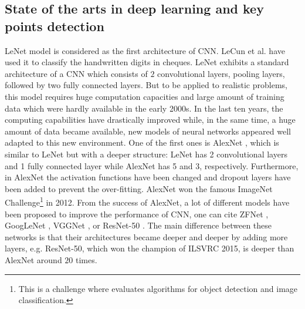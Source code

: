 \documentclass[review]{elsarticle}
\begin{document}
\subsection{State of the arts in deep learning and key points detection}
LeNet \cite{lecun1998gradient} model is considered as the first
architecture of CNN. LeCun et al. \cite{lecun1998gradient} have used
it to classify the handwritten digits in cheques. LeNet exhibits a
standard architecture of a CNN which consists of $2$ convolutional
layers, pooling layers, followed by two fully connected layers. But to
be applied to realistic problems, this model requires huge computation
capacities and large amount of training data which were hardly
available in the early 2000s. In the last ten years, the computing
capabilities have drastically improved while, in the same time, a huge
amount of data became available, new models of neural networks
appeared well adapted to this new environment. One of the first ones
is AlexNet \cite{krizhevsky2012imagenet}, which is similar to LeNet
\cite{lecun1998gradient} but with a deeper structure: LeNet has 2
convolutional layers and 1 fully connected layer while AlexNet has 5
and 3, respectively. Furthermore, in AlexNet the activation functions
have been changed and dropout layers have been added to prevent the
over-fitting. AlexNet won the famous ImageNet Challenge\footnote{This
  is a challenge where evaluates algorithms for object detection and
  image classification.} in 2012. From the success of AlexNet, a lot
of different models have been proposed to improve the performance of
CNN, one can cite ZFNet  \cite{zeiler2014visualizing}, GoogLeNet
\cite{szegedy2015going}, VGGNet \cite{simonyan2014very}, or ResNet-50
\cite{he2016deep}. The main difference between these networks is that
their architectures became deeper and deeper by adding more layers,
e.g. ResNet-50, which won the champion of ILSVRC 2015, is deeper than
AlexNet around $20$ times.
\end{document}
